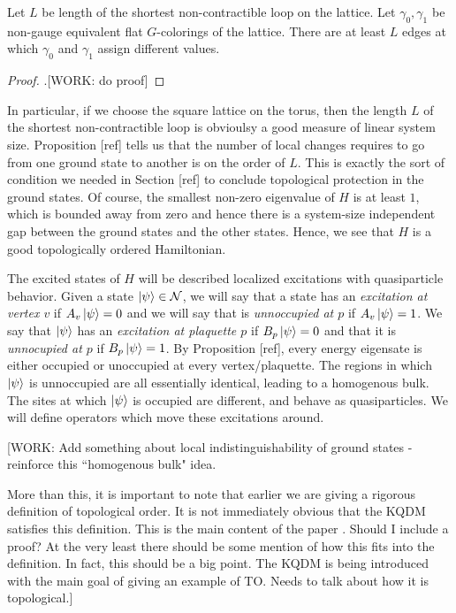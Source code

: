 \begin{proposition} Let $L$ be length of the shortest non-contractible loop on the lattice. Let $\gamma_0,\gamma_1$ be non-gauge equivalent flat $G$-colorings of the lattice. There are at least $L$ edges at which $\gamma_0$ and $\gamma_1$ assign different values.
\end{proposition} 
\begin{proof}.[WORK: do proof]
\end{proof}

In particular, if we choose the square lattice on the torus, then the length $L$ of the shortest non-contractible loop is obvioulsy a good measure of linear system size. Proposition [ref] tells us that the number of local changes requires to go from one ground state to another is on the order of $L$. This is exactly the sort of condition we needed in Section [ref] to conclude topological protection in the ground states. Of course, the smallest non-zero eigenvalue of $H$ is at least $1$, which is bounded away from zero and hence there is a system-size independent gap between the ground states and the other states. Hence, we see that $H$ is a good topologically ordered Hamiltonian. 

The excited states of $H$ will be described localized excitations with quasiparticle behavior. Given a state $\ket{\psi}\in \mathcal{N}$, we will say that a state has an \textit{excitation at vertex $v$} if $A_v\ket{\psi}=0$ and we will say that is \textit{unnoccupied at $p$} if $A_v\ket{\psi}=1$. We say that $\ket{\psi}$ has an \textit{excitation at plaquette $p$} if $B_p\ket{\psi}=0$ and that it is \textit{unnocupied at $p$} if $B_p\ket{\psi}=1$. By Proposition [ref], every energy eigensate is either occupied or unoccupied at every vertex/plaquette. The regions in which $\ket{\psi}$ is unnoccupied are all essentially identical, leading to a homogenous bulk. The sites at which $\ket{\psi}$ is occupied are different, and behave as quasiparticles. We will define operators which move these excitations around.

[WORK: Add something about local indistinguishability of ground states - reinforce this ``homogenous bulk" idea.

More than this, it is important to note that earlier we are giving a rigorous definition of topological order. It is not immediately obvious that the KQDM satisfies this definition. This is the main content of the paper \cite{cui2020kitaev}. Should I include a proof? At the very least there should be some mention of how this fits into the definition. In fact, this should be a big point. The KQDM is being introduced with the main goal of giving an example of TO. Needs to talk about how it is topological.]

